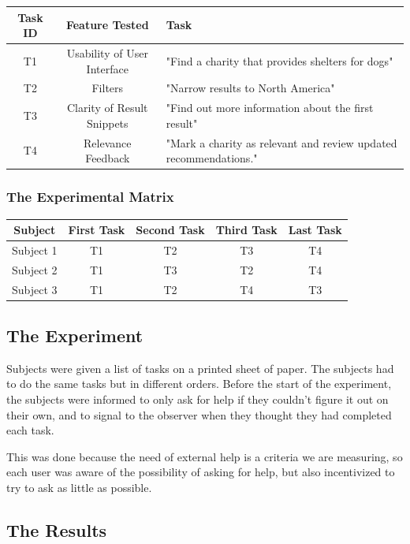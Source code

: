 \documentclass[unicode,9pt,a4paper,oneside,numbers=endperiod,openany]{scrartcl}
\begin{document}
\begin{tabular}{c|c|l}

    Task ID & Feature Tested & Task \\ \hline
    T1 & Usability of User Interface & "Find a charity that provides shelters for dogs" \\ 
    T2 & Filters & "Narrow results to North America" \\
    T3 & Clarity of Result Snippets & "Find out more information about the first result" \\
    T4 & Relevance Feedback & "Mark a charity as relevant and review updated recommendations." \\      
\end{tabular}

\subsubsection{The Experimental Matrix}

\begin{tabular}{c|c|c|c|c}

    Subject & First Task & Second Task & Third Task & Last Task \\ \hline
    Subject 1 & T1 & T2 & T3 & T4 \\
    Subject 2 & T1 & T3 & T2 & T4 \\
    Subject 3 & T1 & T2 & T4 & T3 \\
\end{tabular}

\subsection{The Experiment}

Subjects were given a list of tasks on a printed sheet of paper. The subjects had to do the same tasks but in different orders.
Before the start of the experiment, the subjects were informed to only ask for help if they couldn't figure it out on their own, and to signal to the observer when they thought they had completed each task.

This was done because the need of external help is a criteria we are measuring, so each user was aware of the possibility of asking for help, but also incentivized to try to ask as little as possible.

\subsection{The Results}
\end{document}

